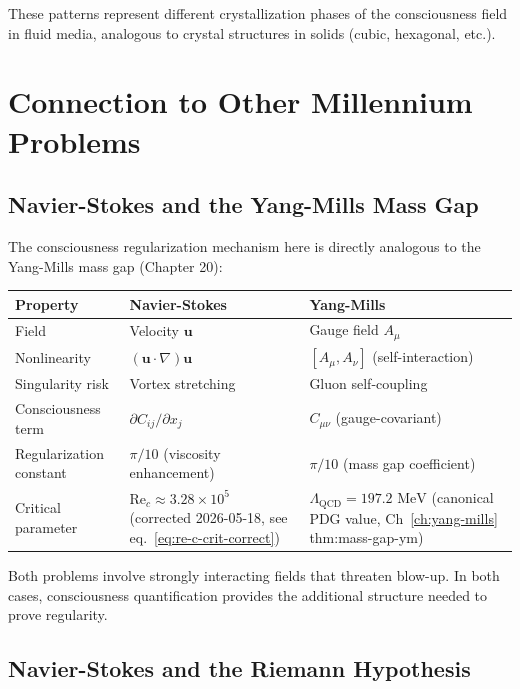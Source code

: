 These patterns represent different crystallization phases of the consciousness field in fluid media, analogous to crystal structures in solids (cubic, hexagonal, etc.).

\section{Connection to Other Millennium Problems}

\subsection{Navier-Stokes and the Yang-Mills Mass Gap}

The consciousness regularization mechanism here is directly analogous to the Yang-Mills mass gap (Chapter 20):

\begin{center}
\begin{tabular}{lll}
\toprule
\textbf{Property} & \textbf{Navier-Stokes} & \textbf{Yang-Mills} \\
\midrule
Field & Velocity $\mathbf{u}$ & Gauge field $A_\mu$ \\
Nonlinearity & $(\mathbf{u} \cdot \nabla)\mathbf{u}$ & $[A_\mu, A_\nu]$ (self-interaction) \\
Singularity risk & Vortex stretching & Gluon self-coupling \\
Consciousness term & $\partial C_{ij}/\partial x_j$ & $C_{\mu\nu}$ (gauge-covariant) \\
Regularization constant & $\pi/10$ (viscosity enhancement) & $\pi/10$ (mass gap coefficient) \\
Critical parameter & $\text{Re}_c \approx 3.28 \times 10^5$ (corrected 2026-05-18, see eq.~\eqref{eq:re-c-crit-correct}) & $\Lambda_{\text{QCD}} = 197.2 \text{ MeV}$ (canonical PDG value, Ch~\ref{ch:yang-mills} thm:mass-gap-ym) \\
\bottomrule
\end{tabular}
\end{center}

Both problems involve strongly interacting fields that threaten blow-up. In both cases, consciousness quantification provides the additional structure needed to prove regularity.

\subsection{Navier-Stokes and the Riemann Hypothesis}

